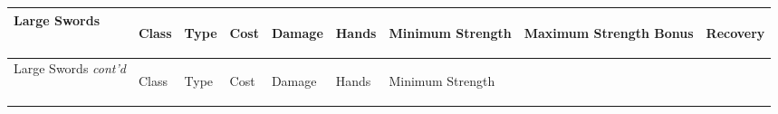 \documentclass[twoside]{book}
\begin{document}
\begin{longtable}{p{1.25in}llllp{2em}p{3em}p{3em}l} 
  Large Swords
  &
  \begin{turn}{70}{Class}\end{turn}
          
  &
  \begin{turn}{70}{Type}\end{turn}
          
  &
  \begin{turn}{70}{Cost}\end{turn}
          
  &
  \begin{turn}{70}{Damage}\end{turn}
          
  &
  \begin{turn}{70}{Hands}\end{turn}
          
  &
  \begin{turn}{70}{Minimum Strength}\end{turn}
          
  &
  \begin{turn}{70}{Maximum Strength Bonus}\end{turn}
          
  &
  \begin{turn}{70}{Recovery}\end{turn}
          
  \\
  \hline
  \hline
  \endfirsthead
  Large Swords \textit{cont'd}
        
  &
  \begin{turn}{70}{Class}\end{turn}
          
  &
  \begin{turn}{70}{Type}\end{turn}
          
  &
  \begin{turn}{70}{Cost}\end{turn}
          
  &
  \begin{turn}{70}{Damage}\end{turn}
          
  &
  \begin{turn}{70}{Hands}\end{turn}
          
  &
  \begin{turn}{70}{Minimum Strength}\end{turn}
          

\end{longtable}
\end{document}
